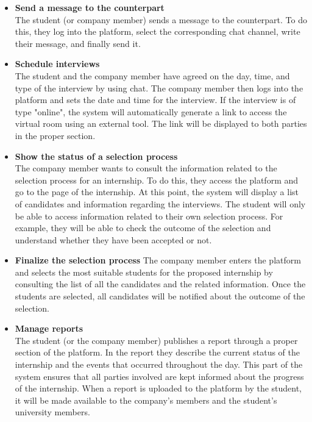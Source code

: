 \begin{itemize}
      \item \textbf{Send a message to the counterpart} \\
      The student (or company member) sends a message to the counterpart. To do this, they log into the platform, select the corresponding chat channel, write their message, and finally send it.
      
      \item \textbf{Schedule interviews} \\
      The student and the company member have agreed on the day, time, and type of the interview by using chat. The company member then logs into the platform and sets the date and time for the interview. If the interview is of type "online", the system will automatically generate a link to access the virtual room using an external tool. The link will be displayed to both parties in the proper section.

      \item \textbf{Show the status of a selection process} \\
      The company member wants to consult the information related to the selection process for an internship. To do this, they access the platform and go to the page of the internship. At this point, the system will display a list of candidates and information regarding the interviews. The student will only be able to access information related to their own selection process. For example, they will be able to check the outcome of the selection and understand whether they have been accepted or not.

      \item \textbf{Finalize the selection process}
      The company member enters the platform and selects the most suitable students for the proposed internship by consulting the list of all the candidates and the related information. Once the students are selected, all candidates will be notified about the outcome of the selection.

      \item \textbf{Manage reports} \\
      The student (or the company member) publishes a report through a proper section of the platform. In the report they describe the current status of the internship and the events that occurred throughout the day. This part of the system ensures that all parties involved are kept informed about the progress of the internship. When a report is uploaded to the platform by the student, it will be made available to the company's members and the student's university members.


\end{itemize}
